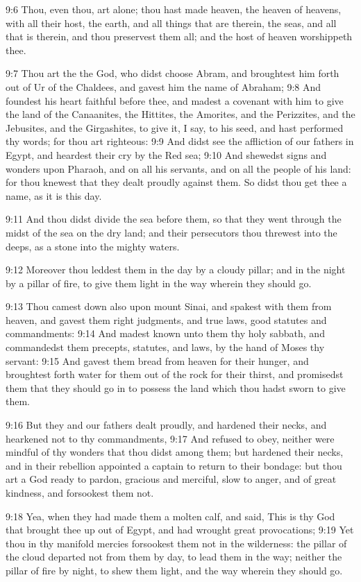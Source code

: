 9:6 Thou, even thou, art \LORD alone; thou hast made heaven, the heaven of heavens, with all their host, the earth, and all things that are therein, the seas, and all that is therein, and thou preservest them all; and the host of heaven worshippeth thee.

9:7 Thou art the \LORD the God, who didst choose Abram, and broughtest him forth out of Ur of the Chaldees, and gavest him the name of Abraham; 9:8 And foundest his heart faithful before thee, and madest a covenant with him to give the land of the Canaanites, the Hittites, the Amorites, and the Perizzites, and the Jebusites, and the Girgashites, to give it, I say, to his seed, and hast performed thy words; for thou art righteous: 9:9 And didst see the affliction of our fathers in Egypt, and heardest their cry by the Red sea; 9:10 And shewedst signs and wonders upon Pharaoh, and on all his servants, and on all the people of his land: for thou knewest that they dealt proudly against them. So didst thou get thee a name, as it is this day.

9:11 And thou didst divide the sea before them, so that they went through the midst of the sea on the dry land; and their persecutors thou threwest into the deeps, as a stone into the mighty waters.

9:12 Moreover thou leddest them in the day by a cloudy pillar; and in the night by a pillar of fire, to give them light in the way wherein they should go.

9:13 Thou camest down also upon mount Sinai, and spakest with them from heaven, and gavest them right judgments, and true laws, good statutes and commandments: 9:14 And madest known unto them thy holy sabbath, and commandedst them precepts, statutes, and laws, by the hand of Moses thy servant: 9:15 And gavest them bread from heaven for their hunger, and broughtest forth water for them out of the rock for their thirst, and promisedst them that they should go in to possess the land which thou hadst sworn to give them.

9:16 But they and our fathers dealt proudly, and hardened their necks, and hearkened not to thy commandments, 9:17 And refused to obey, neither were mindful of thy wonders that thou didst among them; but hardened their necks, and in their rebellion appointed a captain to return to their bondage: but thou art a God ready to pardon, gracious and merciful, slow to anger, and of great kindness, and forsookest them not.

9:18 Yea, when they had made them a molten calf, and said, This is thy God that brought thee up out of Egypt, and had wrought great provocations; 9:19 Yet thou in thy manifold mercies forsookest them not in the wilderness: the pillar of the cloud departed not from them by day, to lead them in the way; neither the pillar of fire by night, to shew them light, and the way wherein they should go.

